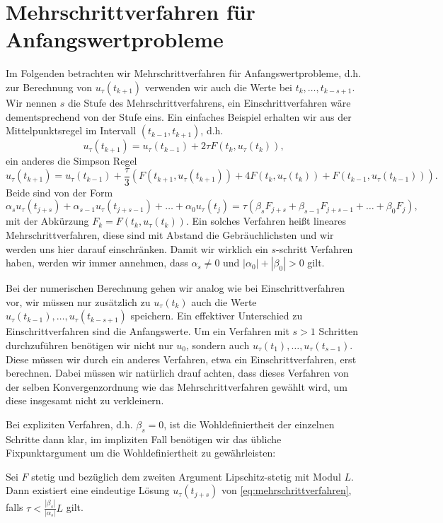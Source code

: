 \section{Mehrschrittverfahren für Anfangswertprobleme}
%
Im Folgenden betrachten wir Mehrschrittverfahren für Anfangswertprobleme, d.h. zur Berechnung von $u_\tau(t_{k+1})$ verwenden wir auch die Werte bei $t_k, \ldots, t_{k-s+1}$. Wir nennen $s$ die Stufe des Mehrschrittverfahrens, ein Einschrittverfahren wäre dementsprechend von der Stufe eins. Ein einfaches Beispiel erhalten wir aus der Mittelpunktsregel im Intervall $(t_{k-1},t_{k+1})$, d.h.
$$ u_{\tau}(t_{k+1}) = u_\tau(t_{k-1}) + 2 \tau   F(t_k,u_\tau(t_k))  , $$
ein anderes die Simpson Regel
$$ u_{\tau}(t_{k+1}) = u_\tau(t_{k-1}) + \frac{\tau}3 ( F(t_{k+1},u_\tau(t_{k+1}))+ 4 F(t_k,u_\tau(t_k)) + F(t_{k-1},u_\tau(t_{k-1}))).$$
Beide sind von der Form
\begin{equation} \label{eq:mehrschrittverfahren}
\alpha_s u_\tau(t_{j+s}) + \alpha_{s-1} u_\tau(t_{j+s-1})+\ldots+\alpha_0 u_\tau(t_j) = \tau (\beta_s F_{j+s}  + \beta_{s-1}  F_{j+s-1}+\ldots+\beta_0 F_j ) ,
\end{equation} 
mit der Abkürzung $F_k = F(t_k,u_\tau(t_k))$. Ein solches Verfahren hei{\ss}t lineares Mehrschrittverfahren, diese sind mit Abstand die Gebräuchlichsten und wir werden uns hier darauf einschränken. Damit wir wirklich ein $s$-schritt Verfahren haben, werden wir immer annehmen, dass $\alpha_s \neq 0$ und $|\alpha_0|+|\beta_0|> 0$ gilt.

Bei der numerischen Berechnung gehen wir analog wie bei Einschrittverfahren vor, wir müssen nur zusätzlich zu $u_\tau(t_k)$ auch die Werte $u_\tau(t_{k-1}),\ldots,u_\tau(t_{k-s+1})$ speichern. Ein effektiver Unterschied zu Einschrittverfahren sind die Anfangswerte. Um ein Verfahren mit $s>1$ Schritten durchzuführen benötigen wir nicht nur $u_0$, sondern auch $u_\tau(t_1),\ldots,u_\tau(t_{s-1})$. Diese müssen wir durch ein anderes Verfahren, etwa ein Einschrittverfahren, erst berechnen. Dabei müssen wir natürlich drauf achten, dass dieses Verfahren von der selben Konvergenzordnung wie das Mehrschrittverfahren gewählt wird, um diese insgesamt nicht zu verkleinern. 

Bei expliziten Verfahren, d.h. $\beta_s = 0$, ist die Wohldefiniertheit der einzelnen Schritte dann klar, im impliziten Fall benötigen wir das übliche Fixpunktargument um die Wohldefiniertheit zu gewährleisten:
\begin{lemma}{}{}
Sei $F$ stetig und bezüglich dem zweiten Argument Lipschitz-stetig mit Modul $L$. Dann existiert eine eindeutige Lösung $u_\tau(t_{j+s})$ von \eqref{eq:mehrschrittverfahren}, falls $\tau < \frac{|\beta_s|}{|\alpha_s|}L$ gilt. 
\end{lemma} 

